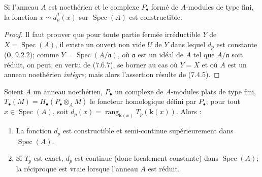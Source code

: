 \begin{lemma}[7.6.8]
Si l'anneau $A$ est noethérien et le complexe $P_\bullet$ formé de $A$-modules
de type fini, la fonction $x\leadsto d_p^T(x)$ sur $\operatorname{Spec}(A)$ est
constructible.
\end{lemma}

\begin{proof}
Il faut prouver que pour toute partie fermée irréductible $Y$ de
$X=\operatorname{Spec}(A)$, il existe un ouvert non vide $U$ de $Y$ dans lequel
$d_p$ est constante ($\mathbf{0}$, 9.2.2); comme
$Y=\operatorname{Spec}(A/\mathfrak a)$, où $\mathfrak a$ est un idéal de $A$ tel
que $A/\mathfrak a$ soit réduit, on peut, en vertu de (7.6.7), se borner au cas
où $Y=X$ et où $A$ est un anneau noethérien \emph{intègre}; mais alors l'assertion
résulte de (7.4.5).
\end{proof}

\begin{theorem}[7.6.9]
Soient $A$ un anneau noethérien, $P_\bullet$ un complexe de $A$-modules plats de
type fini, $T_\bullet(M)=H_\bullet(P_\bullet\otimes_A M)$ le foncteur homologique
défini par $P_\bullet$; pour tout $x\in\operatorname{Spec}(A)$, soit
$d_p(x)=\operatorname{rang}_{\mathbf{k}(x)}T_p(\boldsymbol{k}(x))$.
Alors :
\begin{enumerate}
  \item[\textup{(i)}] La fonction $d_p$ est constructible et semi-continue
    supérieurement dans $\operatorname{Spec}(A)$.
  \item[\textup{(ii)}] Si $T_p$ est exact, $d_p$ est continue (donc localement constante)
    dans $\operatorname{Spec}(A)$; la réciproque est vraie lorsque l'anneau $A$
    est réduit.
\end{enumerate}
\end{theorem}

